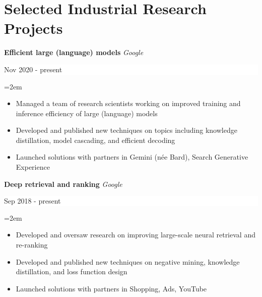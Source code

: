 \documentclass{article}
\newcommand{\NewPart}[1]{\section*{#1}}
\newcommand{\EducationEntry}[4]{
    \noindent \textbf{#1}
    \textit{#3}
    \hfill      %
    \colorbox{White}{
      \parbox{9em}{
      \hfill\color{Black}#2}} \par  %
    \noindent\hangindent=2em\hangafter=0 \small #4 %
    \normalsize \par}
\newcommand{\WorkEntry}[4]{       %
    \noindent
    \textbf{#1}
    \textit{#3} %
    \hfill      %
    \colorbox{White}{%
      \parbox{9em}{%
      \hfill\color{Black}#2}} \par   %
    \noindent\hangindent=2em\hangafter=0 \small #4 %
    \normalsize \par}
\newcommand{\ProjectEntry}[4]{         %
    \noindent \textbf{#1} \noindent {#2} {#3} \par
    \noindent \small #4 %
    \normalsize \par}
\begin{document}




\baselineskip


\NewPart{Selected Industrial Research Projects}{}

\WorkEntry
{Efficient large (language) models}
{Nov 2020 - present}
{Google}
{
\begin{itemize}
    \itemsep-0.1\baselineskip
    \item Managed a team of research scientists working on improved training and inference efficiency of large (language) models
    \item Developed and published new techniques on topics including knowledge distillation, model cascading, and efficient decoding
    \item Launched solutions with partners in Gemini (n\'{e}e Bard), Search Generative Experience
\end{itemize}
}

\WorkEntry
{Deep retrieval and ranking}
{Sep 2018 - present}
{Google}
{
\begin{itemize}
    \itemsep-0.1\baselineskip
    \item Developed and oversaw research on improving large-scale neural retrieval and re-ranking
    \item Developed and published new techniques on negative mining, knowledge distillation, and loss function design
    \item Launched solutions with partners in Shopping, Ads, YouTube
\end{itemize}
}
\end{document}
